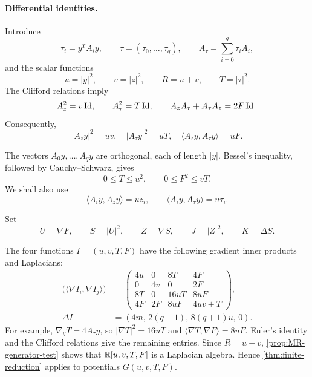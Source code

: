 \paragraph{Differential identities.}

Introduce
\[
 \tau_i=y^TA_i y,\qquad
 \tau=(\tau_0,\ldots,\tau_q),\qquad
 A_\tau=\sum_{i=0}^{q}\tau_iA_i,
\]
and the scalar functions
\[
 u=|y|^2,\qquad v=|z|^2,\qquad R=u+v,\qquad T=|\tau|^2.
\]
The Clifford relations imply
\[
 A_z^2=v\operatorname{Id},\qquad A_\tau^2=T\operatorname{Id},\qquad
 A_zA_\tau+A_\tau A_z=2F\operatorname{Id}.
\]
Consequently,
\begin{equation}\label{eq:clifford-contractions}
 |A_zy|^2=uv,\quad |A_\tau y|^2=uT,\quad
 \langle A_zy,A_\tau y\rangle=uF.
\end{equation}

The vectors $A_0y,\ldots,A_qy$ are orthogonal, each of length $|y|$.
Bessel's inequality, followed by Cauchy--Schwarz, gives
\begin{equation}\label{eq:box-constraints}
 0\leq T\leq u^2,\qquad 0\leq F^2\leq vT.
\end{equation}
We shall also use
\[
 \langle A_i y,A_z y\rangle=uz_i,\qquad
 \langle A_i y,A_\tau y\rangle=u\tau_i.
\]

Set
\[
 U=\nabla F,\qquad S=|U|^2,\qquad Z=\nabla S,\qquad
 J=|Z|^2,\qquad K=\Delta S.
\]

The four functions \(I=(u,v,T,F)\) have the following gradient
inner products and Laplacians:
\begin{equation}\label{eq:clifford-closure-table}
 \begin{aligned}
 \bigl(\langle\nabla I_i,\nabla I_j\rangle\bigr)&=
 \begin{pmatrix}
 4u&0&8T&4F\\
 0&4v&0&2F\\
 8T&0&16uT&8uF\\
 4F&2F&8uF&4uv+T
 \end{pmatrix},\\
 \Delta I&=(4m,\,2(q+1),\,8(q+1)u,\,0).
 \end{aligned}
\end{equation}
For example, \(\nabla_yT=4A_\tau y\), so
\(|\nabla T|^2=16uT\) and \(\langle\nabla T,\nabla F\rangle=8uF\).
Euler's identity and the Clifford relations give the remaining entries.
Since \(R=u+v\), \cref{prop:MR-generator-test} shows that
\(\mathbb R[u,v,T,F]\) is a Laplacian algebra.
Hence \cref{thm:finite-reduction} applies to potentials \(G(u,v,T,F)\).

